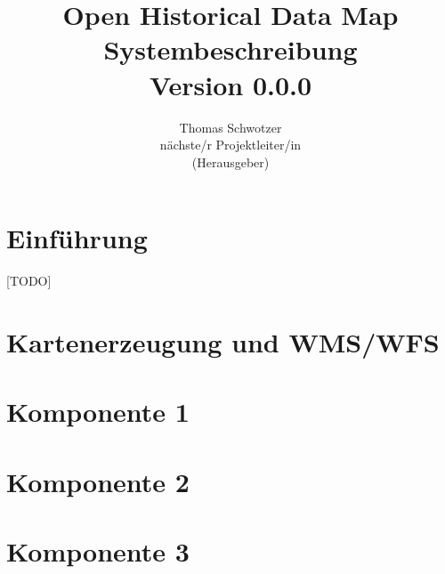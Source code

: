 \documentclass[german]{book}
\begin{document}
\title{Open Historical Data Map\\
Systembeschreibung \\
Version 0.0.0
}

\author{Thomas Schwotzer \\
nächste/r Projektleiter/in\\
(Herausgeber)
}

\maketitle

\tableofcontents

\chapter{Einführung}
[TODO]

\chapter{Kartenerzeugung und WMS/WFS}


\chapter{Komponente 1}
%

\chapter{Komponente 2}
%

\chapter{Komponente 3}
%
\end{document}
